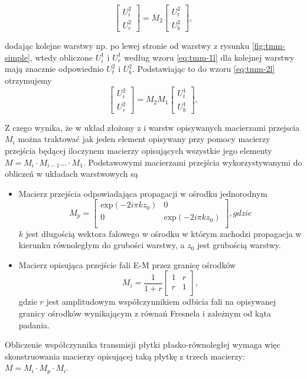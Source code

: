 \begin{equation}
	\begin{bmatrix}
	U_i^2 \\ 
	U_r^2
	\end{bmatrix}
	= M_2 
	\begin{bmatrix}
	U_t^2 \\
	U_b^2
	\end{bmatrix},
\label{eq:tmm-2l}
\end{equation}

dodając kolejne warstwy np. po lewej stronie od warstwy z rysunku \ref{fig:tmm-simple}, wtedy obliczone $U_i^1$ i $U_r^1$ według wzoru \ref{eq:tmm-1l} dla kolejnej warstwy mają znacznie odpowiednio $U_t^2$ i $U_b^2$. Podstawiając to do wzoru \ref{eq:tmm-2l} otrzymujemy 
\begin{equation}
\begin{bmatrix}
U_i^2 \\ 
U_r^2
\end{bmatrix}
=M_2 M_1 
\begin{bmatrix}
U_t^1 \\
U_b^1
\end{bmatrix},
\label{eq:tmm-2ls}
\end{equation}

Z czego wynika, że w układ złożony z i warstw opisywanych macierzami przejscia $M_i$ można traktować jak jeden element opisywany przy pomocy macierzy przejścia będącej iloczynem macierzy opisujących wszystkie jego elementy $M= M_i \cdot M_{i-1} ... \cdot M_1$. Podstawowymi macierzami przejścia wykorzystywanymi do obliczeń w układach warstwowych są
\begin{itemize}
\item Macierz przejścia odpowiadająca propagacji w ośrodku jednorodnym 
\begin{equation}
	M_p=
	\begin{bmatrix}
	\textrm{exp}(-2i\pi k z_0) & 0 \\
	0	&\textrm{exp}(-2i\pi k z_0)\\
	\end{bmatrix},gdzie
\end{equation}
$k$ jest długością wektora falowego w ośrodku w którym zachodzi propagacja w kierunku równoległym do grubości warstwy, a $z_0$ jest grubością warstwy.
\item Macierz opisująca przejście fali E-M przez granicę ośrodków
\begin{equation}
	M_i=\frac{1}{1+r}
	\begin{bmatrix}
	1 & r \\
	r & 1\\
	\end{bmatrix},
\end{equation}
gdzie $r$ jest amplitudowym współczynnikiem odbicia fali na opisywanej granicy ośrodków wynikającym z równań Fresnela i zależnym od kąta padania. 
\end{itemize}

Obliczenie współczynnika transmisji płytki płasko-równoległej wymaga więc skonstruowania macierzy opisującej taką płytkę z trzech macierzy: $M=M_i \cdot M_p \cdot  M_i$.
